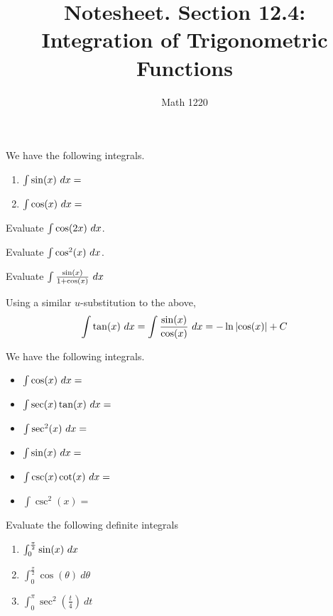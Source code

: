 \documentclass[12pt, a4paper]{article}
\author{Math 1220}
\title{Notesheet. Section 12.4: Integration of Trigonometric Functions}
\date{}
\begin{document}
\maketitle
\nameline
\begin{thrm}
  We have the following integrals.
  \begin{enumerate}
  \item \(\int \sin(x) \ d x = \)
  \item \(\int \cos(x) \ d x = \)
  \end{enumerate}
\end{thrm}
\begin{ex}
  Evaluate \(\int \cos(2x) \ d x\).
\end{ex}
\begin{ex}
  Evaluate \(\int \cos^2(x) \ d x\).
\end{ex}
\begin{ex}
  Evaluate \(\int \frac{\sin(x)}{1+\cos(x)} \ d x\)
\end{ex}
\begin{thrm}
  Using a similar \(u\)-substitution to the above, \[
    \int \tan(x) \ d x = \int \frac{\sin(x)}{\cos(x)} \ d x = - \ln\left| \cos(x) \right| + C
  \]
\end{thrm}
\vspace{-0.75in}
\begin{thrm}
  We have the following integrals.\\
  \begin{minipage}{0.5\linewidth}
    \begin{itemize}
    \item \(\int \cos(x) \ d x = \)
    \item \(\int \sec(x) \tan(x) \ d x = \)
    \item \(\int \sec^2(x) \ d x = \)
    \end{itemize}
  \end{minipage}
  \begin{minipage}{0.4\linewidth}
    \begin{itemize}
    \item \(\int \sin(x) \ d x = \)
    \item \(\int \csc(x) \cot(x) \ d x = \)
    \item \(\int \csc^2(x) = \)
    \end{itemize}
  \end{minipage}
\end{thrm}
\vspace{-0.75in}
\begin{ex}
  Evaluate the following definite integrals
  \begin{enumerate}
  \item \(\int_0^{\frac{\pi}{2}} \sin(x) \ d x\)
    \vspace{0.75in}
  \item \(\int_0^{\frac{\pi}{2}} \cos(\theta) \ d\theta\)
    \vspace{0.75in}
  \item \(\int_0^\pi \sec^2\left(\frac{t}{4}\right) \ dt\)
  \end{enumerate}
\end{ex}
\end{document}
